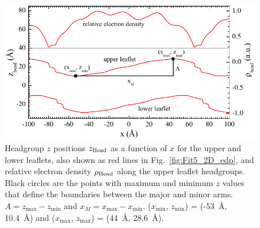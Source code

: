 \begin{figure}[htbp]
  \centering
  \includegraphics[width=\textwidth]{figures/ripple/LAXS/PF5_headgroup}
  \caption{Headgroup $z$ positions $z_\text{Head}$ as a function of $x$ for the upper and lower leaflets,
  also shown as red lines in Fig.~\ref{fig:Fit5_2D_edp}, and
  relative electron density $\rho_\text{Head}$ along the upper leaflet headgroups.
  Black circles are the points with maximum and minimum $z$ values that define the boundaries between 
  the major and minor arms. 
  $A = z_\text{max}-z_\text{min}$ and $x_M = x_\text{max}-x_\text{min}$.
  ($x_\text{min}$, $z_\text{min}$) = (-53~\AA, 10.4~\AA) and 
  ($x_\text{max}$, $z_\text{max}$) = (44~\AA, 28.6~\AA).}  
  \label{fig:PF5_headgroup}
\end{figure}

